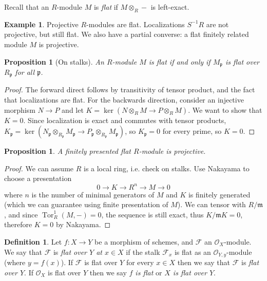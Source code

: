 \documentclass[10pt]{article}
\newtheorem{prop}[thm]{Proposition}
\theoremstyle{definition}
\newtheorem{exmp}[thm]{Example}
\newtheorem{defn}[thm]{Definition}
\DeclareMathOperator{\Tor}{Tor}
\newcommand{\mf}{\mathfrak}
\newcommand{\OO}{\mathcal{O}}
\begin{document}
Recall that an $R$-module $M$ is \emph{flat} if $M \otimes_R -$ is left-exact.

\begin{exmp}
Projective $R$-modules are flat.  Localizations $S^{-1}R$ are not projective, but still flat.  We also have a partial converse: a flat finitely related module $M$ is projective.
\end{exmp}


\begin{prop}[On stalks]
An $R$-module $M$ is flat if and only if $M_{\mf{p}}$ is flat over $R_{\mf{p}}$ for all $\mf{p}$.
\end{prop}
\begin{proof}
The forward direct follows by transitivity of tensor product, and the fact that localizations are flat.  For the backwards direction, consider an injective morphism $N \rightarrow P$ and let $K = \ker(N \otimes_R M \rightarrow P \otimes_R M)$.  We want to show that $K = 0$.  Since localization is exact and commutes with tensor products, $K_{\mf{p}} = \ker(N_{\mf{p}} \otimes_{R_{\mf{p}}} M_{\mf{p}} \rightarrow P_{\mf{p}} \otimes_{R_{\mf{p}}} M_{\mf{p}})$, so $K_{\mf{p}} = 0$ for every prime, so $K = 0$.
\end{proof}


\begin{prop}
A finitely presented flat $R$-module is projective.
\end{prop}
\begin{proof}
We can assume $R$ is a local ring, i.e. check on stalks.  Use Nakayama to choose a presentation
$$0 \rightarrow K \rightarrow R^n \rightarrow M \rightarrow 0$$
where $n$ is the number of minimal generators of $M$ and $K$ is finitely generated (which we can guarantee using finite presentation of $M$).  We can tensor with $R/\mf{m}$, and since $\Tor^1_R(M, -) = 0$, the sequence is still exact, thus $K/\mf{m}K = 0$, therefore $K = 0$ by Nakayama.
\end{proof}

\begin{defn}
Let $f: X \rightarrow Y$ be a morphism of schemes, and $\mathcal{F}$ an $\OO_X$-module.  We say that $\mathcal{F}$ is \emph{flat over $Y$ at $x \in X$} if the stalk $\mathcal{F}_x$ is flat as an $\OO_{Y, y}$-module (where $y=f(x)$).  If $\mathcal{F}$ is flat over $Y$ for every $x \in X$ then we say that $\mathcal{F}$ is \emph{flat over $Y$}.  If $\OO_X$ is flat over $Y$ then we say \emph{$f$ is flat} or \emph{$X$ is flat over $Y$}.
\end{defn}
\end{document}
